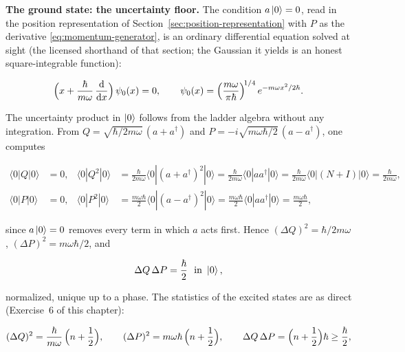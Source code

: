 \textbf{The ground state: the uncertainty floor.} The condition $a\ket{0} = 0$, read in the position representation of Section~\ref{sec:position-representation} with $P$ as the derivative \eqref{eq:momentum-generator}, is an ordinary differential equation solved at sight (the licensed shorthand of that section; the Gaussian it yields is an honest square-integrable function):
\begin{linenomath}
    \begin{equation}
        \Bigl(x + \frac{\hbar}{m\omega}\,\frac{\mathrm{d}}{\mathrm{d} x}\Bigr)\,\psi_0(x) = 0,
        \qquad
        \psi_0(x) = \Bigl(\frac{m\omega}{\pi\hbar}\Bigr)^{\!1/4}\,e^{-m\omega x^2/2\hbar}.
        \label{eq:oscillator-ground}
    \end{equation}
\end{linenomath}
The uncertainty product in $\ket{0}$ follows from the ladder algebra without any integration. From $Q=\sqrt{\hbar/2m\omega}\,(a+a^\dagger)$ and $P=-i\sqrt{m\omega\hbar/2}\,(a-a^\dagger)$, one computes
\begin{linenomath}
    \begin{align*}
        \langle 0|Q|0\rangle &= 0, &
        \langle 0|Q^2|0\rangle &= \frac{\hbar}{2m\omega}\langle 0|(a+a^\dagger)^2|0\rangle
        = \frac{\hbar}{2m\omega}\langle 0|aa^\dagger|0\rangle
        = \frac{\hbar}{2m\omega}\langle 0|(N+I)|0\rangle
        = \frac{\hbar}{2m\omega},\\[4pt]
        \langle 0|P|0\rangle &= 0, &
        \langle 0|P^2|0\rangle &= \frac{m\omega\hbar}{2}\langle 0|(a-a^\dagger)^2|0\rangle
        = \frac{m\omega\hbar}{2}\langle 0|aa^\dagger|0\rangle
        = \frac{m\omega\hbar}{2},
    \end{align*}
\end{linenomath}
since $a\ket{0}=0$ removes every term in which $a$ acts first. Hence $(\Delta Q)^2=\hbar/2m\omega$, $(\Delta P)^2=m\omega\hbar/2$, and
\begin{linenomath}
    \begin{equation*}
        \Delta Q\,\Delta P = \frac{\hbar}{2}\ \ \text{in }\ket{0},
    \end{equation*}
\end{linenomath}
normalized, unique up to a phase. The statistics of the excited states are as direct (Exercise~6 of this chapter):
\begin{linenomath}
    \begin{equation}
        (\Delta Q)^2 = \frac{\hbar}{m\omega}\,\Bigl(n + \frac{1}{2}\Bigr),
        \qquad
        (\Delta P)^2 = m\omega\hbar\,\Bigl(n + \frac{1}{2}\Bigr),
        \qquad
        \Delta Q\,\Delta P = \Bigl(n + \frac{1}{2}\Bigr)\hbar \geq \frac{\hbar}{2},
    \end{equation}
\end{linenomath}
